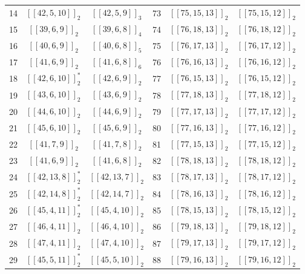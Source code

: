 \documentclass[journal]{IEEEtran}
\begin{document}
\begin{table}[!t]
\begin{threeparttable}
\begin{tabular}{cccccc}
			14  &     $[[42,5,10]]_2$     &        $[[42,5,9]]_3$         & 73  &    $[[75,15,13]]_2$     &       $[[75,15,12]]_2$        \\
			15  &     $[[39,6,9]]_2$      &        $[[39,6,8]]_4$         & 74  &    $[[76,18,13]]_2$     &       $[[76,18,12]]_2$        \\
			16  &     $[[40,6,9]]_2$      &        $[[40,6,8]]_5$         & 75  &    $[[76,17,13]]_2$     &       $[[76,17,12]]_2$        \\
			17  &     $[[41,6,9]]_2$      &        $[[41,6,8]]_6$         & 76  &    $[[76,16,13]]_2$     &       $[[76,16,12]]_2$        \\
			18  &    $[[42,6,10]]_2^*$    &        $[[42,6,9]]_2$         & 77  &    $[[76,15,13]]_2$     &       $[[76,15,12]]_2$        \\
			19  &     $[[43,6,10]]_2$     &        $[[43,6,9]]_2$         & 78  &    $[[77,18,13]]_2$     &       $[[77,18,12]]_2$        \\
			20  &     $[[44,6,10]]_2$     &        $[[44,6,9]]_2$         & 79  &    $[[77,17,13]]_2$     &       $[[77,17,12]]_2$        \\
			21  &     $[[45,6,10]]_2$     &        $[[45,6,9]]_2$         & 80  &    $[[77,16,13]]_2$     &       $[[77,16,12]]_2$        \\
			22  &     $[[41,7,9]]_2$      &        $[[41,7,8]]_2$         & 81  &    $[[77,15,13]]_2$     &       $[[77,15,12]]_2$        \\
			23  &     $[[41,6,9]]_2$      &        $[[41,6,8]]_2$         & 82  &    $[[78,18,13]]_2$     &       $[[78,18,12]]_2$        \\
			24  &    $[[42,13,8]]_2^*$    &        $[[42,13,7]]_2$        & 83  &    $[[78,17,13]]_2$     &       $[[78,17,12]]_2$        \\
			25  &    $[[42,14,8]]_2^*$    &        $[[42,14,7]]_2$        & 84  &    $[[78,16,13]]_2$     &       $[[78,16,12]]_2$        \\
			26  &    $[[45,4,11]]_2^*$    &        $[[45,4,10]]_2$        & 85  &    $[[78,15,13]]_2$     &       $[[78,15,12]]_2$        \\
			27  &     $[[46,4,11]]_2$     &        $[[46,4,10]]_2$        & 86  &    $[[79,18,13]]_2$     &       $[[79,18,12]]_2$        \\
			28  &     $[[47,4,11]]_2$     &        $[[47,4,10]]_2$        & 87  &    $[[79,17,13]]_2$     &       $[[79,17,12]]_2$        \\
			29  &    $[[45,5,11]]_2^*$    &        $[[45,5,10]]_2$        & 88  &    $[[79,16,13]]_2$     &       $[[79,16,12]]_2$        \\

\end{tabular}
\end{threeparttable}
\end{table}
\end{document}
